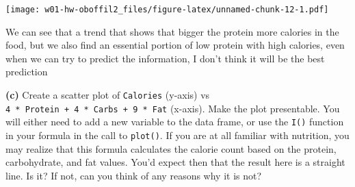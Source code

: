 \documentclass[]{article}
\newenvironment{Shaded}{\begin{snugshade}}{\end{snugshade}}
\newcommand{\DataTypeTok}[1]{\textcolor[rgb]{0.13,0.29,0.53}{#1}}
\newcommand{\DecValTok}[1]{\textcolor[rgb]{0.00,0.00,0.81}{#1}}
\newcommand{\KeywordTok}[1]{\textcolor[rgb]{0.13,0.29,0.53}{\textbf{#1}}}
\newcommand{\NormalTok}[1]{#1}
\newcommand{\OperatorTok}[1]{\textcolor[rgb]{0.81,0.36,0.00}{\textbf{#1}}}
\newcommand{\StringTok}[1]{\textcolor[rgb]{0.31,0.60,0.02}{#1}}
\begin{document}
\begin{Shaded}
\end{Shaded}

\texttt{[image: w01-hw-oboffil2\_files/figure-latex/unnamed-chunk-12-1.pdf]}

We can see that a trend that shows that bigger the protein more calories
in the food, but we also find an essential portion of low protein with
high calories, even when we can try to predict the information, I don't
think it will be the best prediction

\textbf{(c)} Create a scatter plot of \texttt{Calories} (y-axis) vs
\texttt{4\ *\ Protein\ +\ 4\ *\ Carbs\ +\ 9\ *\ Fat} (x-axis). Make the
plot presentable. You will either need to add a new variable to the data
frame, or use the \texttt{I()} function in your formula in the call to
\texttt{plot()}. If you are at all familiar with nutrition, you may
realize that this formula calculates the calorie count based on the
protein, carbohydrate, and fat values. You'd expect then that the result
here is a straight line. Is it? If not, can you think of any reasons why
it is not?
\end{document}
